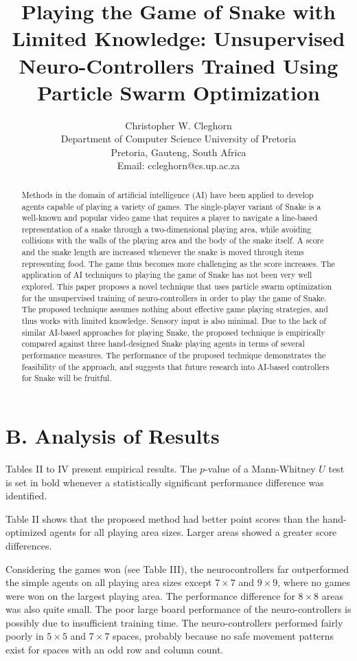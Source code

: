 \documentclass[10pt]{article}
\title{Playing the Game of Snake with Limited Knowledge: Unsupervised Neuro-Controllers Trained Using Particle Swarm Optimization }
\author{Christopher W. Cleghorn\\
Department of Computer Science University of Pretoria\\
Pretoria, Gauteng, South Africa\\
Email: ccleghorn@cs.up.ac.za}
\date{}
\begin{document}
\maketitle
\captionsetup{singlelinecheck=false}


\begin{abstract}
Methods in the domain of artificial intelligence (AI) have been applied to develop agents capable of playing a variety of games. The single-player variant of Snake is a well-known and popular video game that requires a player to navigate a line-based representation of a snake through a two-dimensional playing area, while avoiding collisions with the walls of the playing area and the body of the snake itself. A score and the snake length are increased whenever the snake is moved through items representing food. The game thus becomes more challenging as the score increases. The application of AI techniques to playing the game of Snake has not been very well explored. This paper proposes a novel technique that uses particle swarm optimization for the unsupervised training of neuro-controllers in order to play the game of Snake. The proposed technique assumes nothing about effective game playing strategies, and thus works with limited knowledge. Sensory input is also minimal. Due to the lack of similar AI-based approaches for playing Snake, the proposed technique is empirically compared against three hand-designed Snake playing agents in terms of several performance measures. The performance of the proposed technique demonstrates the feasibility of the approach, and suggests that future research into AI-based controllers for Snake will be fruitful.
\end{abstract}



\section*{B. Analysis of Results}
Tables II to IV present empirical results. The $p$-value of a Mann-Whitney $U$ test is set in bold whenever a statistically significant performance difference was identified.

Table II shows that the proposed method had better point scores than the hand-optimized agents for all playing area sizes. Larger areas showed a greater score differences.

Considering the games won (see Table III), the neurocontrollers far outperformed the simple agents on all playing area sizes except $7 \times 7$ and $9 \times 9$, where no games were won on the largest playing area. The performance difference for $8 \times 8$ areas was also quite small. The poor large board performance of the neuro-controllers is possibly due to insufficient training time. The neuro-controllers performed fairly poorly in $5 \times 5$ and $7 \times 7$ spaces, probably because no safe movement patterns exist for spaces with an odd row and column count.
\end{document}

